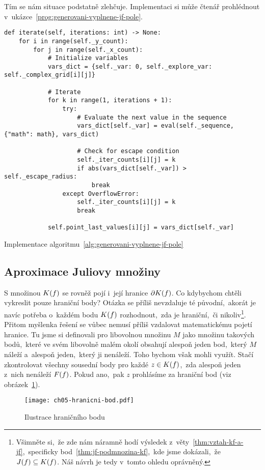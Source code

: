 Tím se nám situace podstatně zlehčuje. Implementaci si může čtenář prohlédnout v~ukázce~\ref{prog:generovani-vyplnene-jf-pole}.
\begin{program}[h]
\begin{lstlisting}[style=python]
def iterate(self, iterations: int) -> None:
    for i in range(self._y_count):
        for j in range(self._x_count):
            # Initialize variables
            vars_dict = {self._var: 0, self._explore_var: self._complex_grid[i][j]}

            # Iterate
            for k in range(1, iterations + 1):
                try:
                    # Evaluate the next value in the sequence
                    vars_dict[self._var] = eval(self._sequence, {"math": math}, vars_dict)

                    # Check for escape condition
                    self._iter_counts[i][j] = k
                    if abs(vars_dict[self._var]) > self._escape_radius:
                        break
                except OverflowError:
                    self._iter_counts[i][j] = k
                    break
            
            self.point_last_values[i][j] = vars_dict[self._var]
\end{lstlisting}
    \caption{Implementace algoritmu~\ref{alg:generovani-vyplnene-jf-pole}}
    \label{prog:generovani-vyplnene-jf-pole}
\end{program}

\subsection{Aproximace Juliovy množiny}\label{subsec:aproximace-juliovy-mnoziny}

S množinou $K(f)$ se rovněž pojí i~její hranice $\partial K(f)$. Co kdybychom chtěli vykreslit pouze hraniční body? Otázka se příliš nevzdaluje té původní,~akorát je navíc potřeba o~každém bodu $K(f)$ rozhodnout,~zda je hraniční,~či nikoliv\footnote{Všimněte si,~že zde nám náramně hodí výsledek z~věty~\ref{thm:vztah-kf-a-jf},~specificky bod~\ref{thm:jf-podmnozina-kf},~kde jsme dokázali,~že $J(f)\subseteq K(f)$. Náš návrh je tedy v~tomto ohledu oprávněný.}. Přitom myšlenka řešení se vůbec nemusí příliš vzdalovat matematickému pojetí hranice. Tu jsme si definovali pro libovolnou množinu $M$ jako množinu takových bodů,~které ve svém libovolně malém okolí obsahují alespoň jeden bod,~který $M$ náleží a~alespoň jeden,~který ji nenáleží. Toho bychom však mohli využít. Stačí zkontrolovat všechny sousední body pro každé $z\in K(f)$,~zda alespoň jeden z~nich nenáleží $F(f)$. Pokud ano,~pak $z$ prohlásíme za hraniční bod (viz obrázek~\ref{fig:hranicni-bod}).
\begin{figure}[h]
    \centering
    \texttt{[image: ch05-hranicni-bod.pdf]}
    \caption{Ilustrace hraničního bodu}
    \label{fig:hranicni-bod}
\end{figure}


